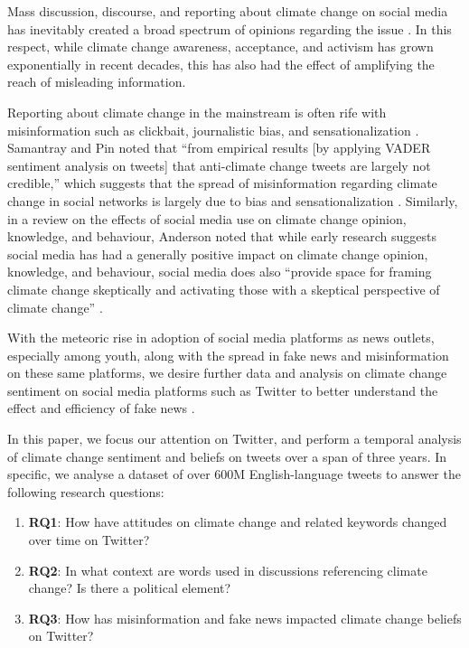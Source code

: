 \documentclass{paper}
\begin{document}
Mass discussion, discourse, and reporting about climate change on social media has inevitably created a broad spectrum of opinions regarding the issue \cite{PRC:HowPeopleWorldwideViewClimateChange}. In this respect, while climate change awareness, acceptance, and activism has grown exponentially in recent decades, this has also had the effect of amplifying the reach of misleading information. 

Reporting about climate change in the mainstream is often rife with misinformation such as clickbait, journalistic bias, and sensationalization \cite{Cook2019}. Samantray and Pin noted that ``from empirical results [by applying VADER sentiment analysis on tweets] that anti-climate change tweets are largely not credible,'' which suggests that the spread of misinformation regarding climate change in social networks is largely due to bias and sensationalization \cite{Samantray2019}. Similarly, in a review on the effects of social media use on climate change opinion, knowledge, and behaviour, Anderson noted that while early research suggests social media has had a generally positive impact on climate change opinion, knowledge, and behaviour, social media does also ``provide space for framing climate change skeptically and activating those with a skeptical perspective of climate change'' \cite{Anderson2017}.

With the meteoric rise in adoption of social media platforms as news outlets, especially among youth, along with the spread in fake news and misinformation on these same platforms, we desire further data and analysis on climate change sentiment on social media platforms such as Twitter to better understand the effect and efficiency of fake news \cite{news_use_across_social_media_platforms_2016, Shu2017}.

In this paper, we focus our attention on Twitter, and perform a temporal analysis of climate change sentiment and beliefs on tweets over a span of three years. In specific, we analyse a dataset of over 600M English-language tweets to answer the following research questions:
\begin{enumerate}
    \item\label{rq1}\textbf{RQ1}: How have attitudes on climate change and related keywords changed over time on Twitter?
    \item\label{rq2}\textbf{RQ2}: In what context are words used in discussions referencing climate change? Is there a political element?
    \item\label{rq2}\textbf{RQ3}: How has misinformation and fake news impacted climate change beliefs on Twitter?
\end{enumerate}
\end{document}
